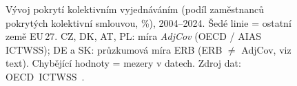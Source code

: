 \def\strEuPokrytiKvVyvojZOOFCaption{Vývoj pokrytí kolektivním vyjednáváním (podíl zaměstnanců pokrytých kolektivní smlouvou, \%), 2004--2024. Šedé linie = ostatní země EU\,27. CZ, DK, AT, PL: míra \textit{AdjCov} (OECD / AIAS ICTWSS); DE a SK: průzkumová míra ERB (ERB \(\neq\) AdjCov, viz text). Chybějící hodnoty = mezery v datech. Zdroj dat: \acs{OECD}~\acs{ICTWSS}~\cite{oecd_aias_ictwss_CBC_ERB_pct}.}%
%

\providecommand\NudgeEuPokrytiKvVyvojZOOFCz{0pt}%
\providecommand\NudgeEuPokrytiKvVyvojZOOFDk{0pt}%
\providecommand\NudgeEuPokrytiKvVyvojZOOFDe{0pt}%
\providecommand\NudgeEuPokrytiKvVyvojZOOFAt{0pt}%
\providecommand\NudgeEuPokrytiKvVyvojZOOFPl{0pt}%
\providecommand\NudgeEuPokrytiKvVyvojZOOFSk{0pt}%
\begin{figure}[H]
  \centering
  \resizebox{\linewidth}{!}{}
  \caption{\strEuPokrytiKvVyvojZOOFCaption}
  \label{fig:eu_pokryti_kv_vyvoj_2004}
\end{figure}
